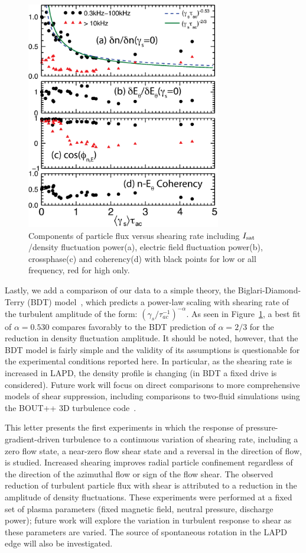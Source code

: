 \documentclass[aps,prl,amsmath,amssymb,preprint,superscriptaddress]{revtex4} %
\begin{document}
\begin{figure}[!htbp]
\centerline{
\includegraphics[width=8.5cm]{figure5.eps}}
\caption{\label{fig:fluxcomps} Components of particle flux versus shearing rate including $I_{\rm sat}$/density fluctuation power(a), electric field fluctuation power(b), crossphase(c) and coherency(d) with black points for low or all frequency, red for high only.}
\end{figure}

Lastly, we add a comparison of our data to a simple theory, the
Biglari-Diamond-Terry (BDT) model~\cite{biglari90}, which predicts a
power-law scaling with shearing rate of the turbulent
amplitude of the form: $\left(\gamma_{s}/\tau_{ac}^{-1}\right)^{-\alpha}$. As seen in
Figure~\ref{fig:fluxcomps}, a best fit of $\alpha = 0.530$ compares
favorably to the BDT prediction of $\alpha = 2/3$ for the reduction in
density fluctuation amplitude. 
It should be noted, however, that the
BDT model is fairly simple and the validity of its assumptions is
questionable for the experimental conditions reported here.  In
particular, as the shearing rate is increased in LAPD, the density
profile is changing (in BDT a fixed drive is considered).  Future work
will focus on direct comparisons to more comprehensive models of shear
suppression, including comparisons to two-fluid simulations using the
BOUT++ 3D turbulence code~\cite{umansky11}.  

This letter presents the first experiments in which the response of
pressure-gradient-driven turbulence to a continuous
variation of shearing rate, including a zero flow state, a near-zero flow shear state and
a reversal in the direction of flow, is studied.  Increased shearing
improves radial particle confinement regardless of the direction of
the azimuthal flow or sign of the flow shear. The observed reduction of
turbulent particle flux with shear is attributed to a reduction in the
amplitude of density fluctuations. These
experiments were performed at a fixed set of plasma parameters (fixed
magnetic field, neutral pressure, discharge power); future work will
explore the variation in turbulent response to shear as these
parameters are varied.  The source of spontaneous rotation in the LAPD edge will also be investigated.  
\end{document}
